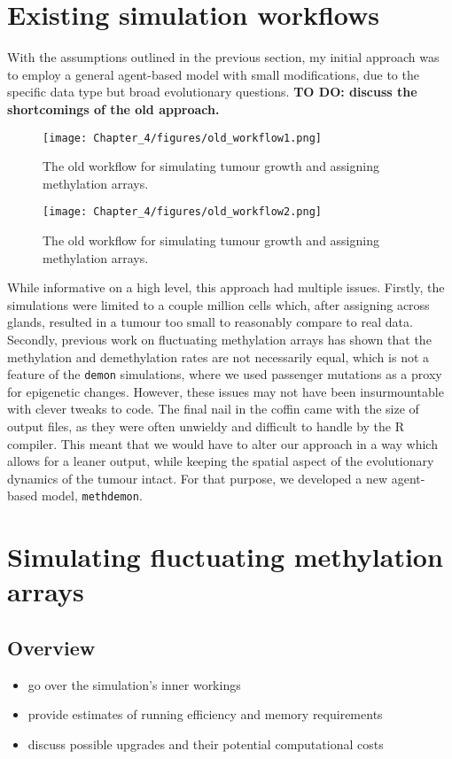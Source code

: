 \section{Existing simulation workflows}\label{section:old_famework}

With the assumptions outlined in the previous section, my initial approach was to employ a general agent-based model
with small modifications, due to the specific data type but broad evolutionary questions.
\textbf{TO DO: discuss the shortcomings of the old approach.}

\begin{figure}[h]
    \centering
    \texttt{[image: Chapter\_4/figures/old\_workflow1.png]}
    \caption{The old workflow for simulating tumour growth and assigning methylation arrays.}
    \label{fig:old_workflow1}
\end{figure}
\begin{figure}[h]
    \centering
    \texttt{[image: Chapter\_4/figures/old\_workflow2.png]}
    \caption{The old workflow for simulating tumour growth and assigning methylation arrays.}
    \label{fig:old_workflow2}
\end{figure}

While informative on a high level, this approach had multiple issues. Firstly, the simulations were
limited to a couple million cells which, after assigning across glands, resulted in a tumour too small
to reasonably compare to real data. Secondly, previous work on fluctuating methylation arrays
\cite{gabbutt_fluctuating_2022, gabbutt_evolutionary_2023} has shown that the methylation and demethylation
rates are not necessarily equal, which is not a feature of the \texttt{demon} simulations, where we used
passenger mutations as a proxy for epigenetic changes. However, these issues may not have been insurmountable
with clever tweaks to code. The final nail in the coffin came with the size of output files, as they were often
unwieldy and difficult to handle by the R compiler. This meant that we would have to alter our approach in a way
which allows for a leaner output, while keeping the spatial aspect of the evolutionary dynamics of the tumour intact.
For that purpose, we developed a new agent-based model, \texttt{methdemon}.


\section{Simulating fluctuating methylation arrays}\label{section:methdemon}
\subsection{Overview}
\begin{itemize}
    \item go over the simulation's inner workings
    \item provide estimates of running efficiency and memory requirements
    \item discuss possible upgrades and their potential computational costs
\end{itemize}
